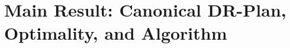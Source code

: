 \newcommand{\drpx}[1]{P_{#1}}
\newcommand{\comdrpx}[1]{P_{#1}^{com}}
\newcommand{\candrpx}[1]{P_{#1}^{can}}
\newcommand{\seqdrpx}[1]{P_{#1}^{seq}}

\newcommand{\pseudosequential}{pseudosequential}
\newcommand{\Pseudosequential}{Pseudosequential}

\newcommand{\componentsx}[1]{\textsc{Components}(#1)}

\newcommand{\Branch}{Branch}
\newcommand{\branch}{branch}
\newcommand{\branches}{branches}

\newcommand{\branchx}[1]{\textsc{Branch}(#1)}
\newcommand{\branchGePG}{$\branchx{G,e,P_G}$}
\newcommand{\branchLfPL}{$\branchx{L,f,P_L}$}



\section{Main Result: Canonical DR-Plan, Optimality, and Algorithm}
\label{sec:DRP}


